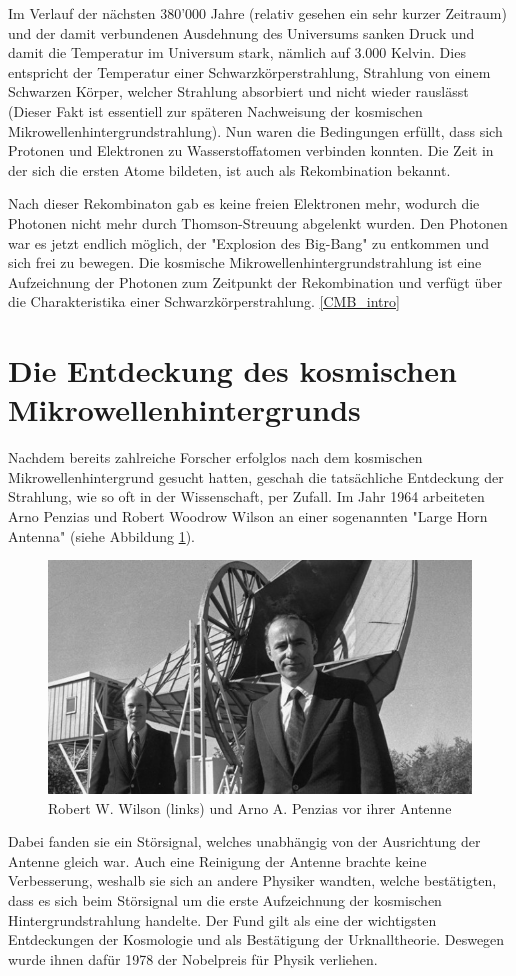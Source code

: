 Im Verlauf der nächsten 380'000 Jahre (relativ gesehen ein sehr kurzer Zeitraum) und der damit verbundenen Ausdehnung des 
Universums sanken Druck und damit die Temperatur im Universum stark, nämlich auf 3.000 
Kelvin.
Dies entspricht der Temperatur einer Schwarzkörperstrahlung, Strahlung von 
einem Schwarzen Körper, welcher Strahlung absorbiert und nicht wieder rauslässt 
(Dieser Fakt ist essentiell zur späteren Nachweisung der kosmischen 
Mikrowellenhintergrundstrahlung).
Nun waren die Bedingungen erfüllt, dass sich Protonen und Elektronen zu 
Wasserstoffatomen verbinden konnten.
Die Zeit in der sich die ersten Atome bildeten, ist auch als Rekombination bekannt.


Nach dieser Rekombinaton gab es keine freien Elektronen mehr, wodurch die 
Photonen nicht mehr durch Thomson-Streuung abgelenkt wurden.
Den Photonen war es jetzt endlich möglich, der "Explosion des Big-Bang" zu 
entkommen und sich frei zu bewegen.
Die kosmische Mikrowellenhintergrundstrahlung ist eine Aufzeichnung der Photonen zum 
Zeitpunkt der Rekombination und verfügt über die Charakteristika einer Schwarzkörperstrahlung.
\ref{CMB_intro}

\section{Die Entdeckung des kosmischen Mikrowellenhintergrunds}
Nachdem bereits zahlreiche Forscher erfolglos nach dem kosmischen 
Mikrowellenhintergrund gesucht hatten, geschah die tatsächliche Entdeckung der 
Strahlung, wie so oft in der Wissenschaft, per Zufall.
Im Jahr 1964 arbeiteten Arno Penzias und Robert Woodrow Wilson an einer 
sogenannten "Large Horn Antenna" (siehe Abbildung \ref{fig:wilson_penzias}).
\begin{figure}
	\includegraphics[width=\linewidth]{cmb/images/penzias-wilson-large-horn-antenna.jpg}
	\caption{Robert W. Wilson (links) und Arno A. Penzias vor ihrer Antenne}
	\label{fig:wilson_penzias}
\end{figure}
Dabei fanden sie ein Störsignal, welches unabhängig von der Ausrichtung der 
Antenne gleich war.
Auch eine Reinigung der Antenne brachte keine Verbesserung, weshalb sie sich an 
andere Physiker wandten, welche bestätigten, dass es sich beim Störsignal um 
die erste Aufzeichnung der kosmischen Hintergrundstrahlung handelte.
Der Fund gilt als eine der wichtigsten Entdeckungen der Kosmologie und als 
Bestätigung der Urknalltheorie.
Deswegen wurde ihnen dafür 1978 der Nobelpreis für Physik verliehen.

